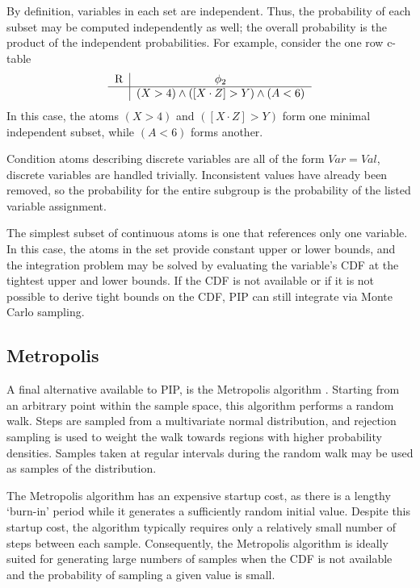 By definition, variables in each set are independent.  Thus, the probability of each subset may be computed independently as well; the overall probability is the product of the independent probabilities.  For example, consider the one row c-table 
\[
\begin{tabular}{c|c}
R & $\phi_2$ \\
\hline
& $(X > 4) \wedge ([X\cdot Z] > Y) \wedge (A < 6)$ \\
\end{tabular}
\]
In this case, the atoms $(X > 4)$ and $([X\cdot Z] > Y)$ form one minimal independent subset, while $(A < 6)$ forms another.

Condition atoms describing discrete variables are all of the form $Var = Val$, discrete variables are handled trivially.  Inconsistent values have already been removed, so the probability for the entire subgroup is the probability of the listed variable assignment.

The simplest subset of continuous atoms is one that references only one variable.  In this case, the atoms in the set provide constant upper or lower bounds, and the integration problem may be solved by evaluating the variable's CDF at the tightest upper and lower bounds.  If the CDF is not available or if it is not possible to derive tight bounds on the CDF, PIP can still integrate via Monte Carlo sampling.  

\subsection{Metropolis}
A final alternative available to PIP, is the
Metropolis  algorithm \cite{metropolis}.   Starting from  an arbitrary
point within the sample space,  this algorithm performs a random walk.
Steps  are  sampled  from  a  multivariate  normal  distribution,  and
rejection sampling  is used  to weight the  walk towards  regions with
higher  probability  densities.  Samples  taken  at regular  intervals
during the random walk may be used as samples of the distribution.

The Metropolis algorithm has an  expensive startup cost, as there is a
lengthy  `burn-in' period  while  it generates  a sufficiently  random
initial  value.  Despite  this startup  cost, the  algorithm typically
requires only a relatively small  number of steps between each sample.
Consequently,   the  Metropolis  algorithm   is  ideally   suited  for
generating large numbers of samples  when the CDF is not available and
the probability of sampling a given value is small.

